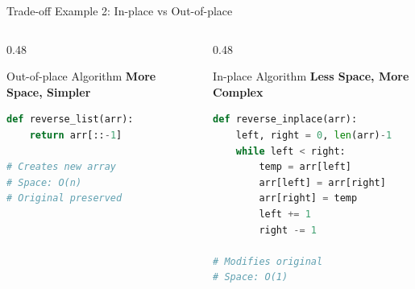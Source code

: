 \documentclass[aspectratio=169,xcolor=dvipsnames]{beamer}
\begin{document}
\begin{frame}[fragile]{Trade-off Example 2: In-place vs Out-of-place}
  \begin{columns}
    \begin{column}{0.48\textwidth}
      \begin{block}{Out-of-place Algorithm}
        \textbf{More Space, Simpler}
        \begin{lstlisting}[language=Python,basicstyle=\small\ttfamily]
def reverse_list(arr):
    return arr[::-1]

# Creates new array
# Space: O(n)
# Original preserved
        \end{lstlisting}
      \end{block}

      \vspace{0.3cm}

    \end{column}
    \begin{column}{0.48\textwidth}
      \begin{block}{In-place Algorithm}
        \textbf{Less Space, More Complex}
        \begin{lstlisting}[language=Python,basicstyle=\small\ttfamily]
def reverse_inplace(arr):
    left, right = 0, len(arr)-1
    while left < right:
        temp = arr[left]
        arr[left] = arr[right]
        arr[right] = temp
        left += 1
        right -= 1

# Modifies original
# Space: O(1)
        \end{lstlisting}
      \end{block}

      \vspace{0.3cm}

    \end{column}
  \end{columns}
\end{frame}
\end{document}
